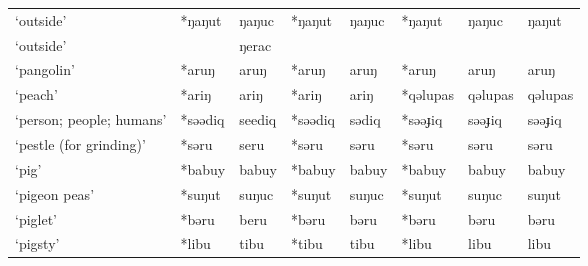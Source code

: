 \begin{landscape}
\begin{longtable}[c]{@{}p{3cm}<{\raggedright}p{2.75cm}<{\raggedright}p{2.75cm}<{\raggedright}p{2.75cm}<{\raggedright}p{2.75cm}<{\raggedright}p{2.75cm}<{\raggedright}p{2.75cm}<{\raggedright}p{2.75cm}<{\raggedright}@{}}
`outside'                                            & *ŋaŋut             & ŋaŋuc                          & *ŋaŋut             & ŋaŋuc                      & *ŋaŋut           & ŋaŋuc                    & ŋaŋut                             \\
`outside'                                            &              & ŋerac                          &                    &                            &                  &                          &                                   \\
`pangolin'                                           & *aruŋ              & aruŋ                           & *aruŋ              & aruŋ                       & *aruŋ            & aruŋ                     & aruŋ                              \\
`peach'                                              & *ariŋ              & ariŋ                           & *ariŋ              & ariŋ                       & *qəlupas         & qəlupas                  & qəlupas                           \\
`person; people; humans'                             & *səədiq            & seediq                         & *səədiq            & sədiq                      & *səəɟiq          & səəɟiq                   & səəɟiq                            \\
`pestle (for grinding)'                              & *səru              & seru                           & *səru              & səru                       & *səru            & səru                     & səru                              \\
`pig'                                                & *babuy             & babuy                          & *babuy             & babuy                      & *babuy           & babuy                    & babuy                             \\
`pigeon peas'                                        & *suŋut             & suŋuc                          & *suŋut             & suŋuc                      & *suŋut           & suŋuc                    & suŋut                             \\
`piglet'                                             & *bəru              & beru                           & *bəru              & bəru                       & *bəru            & bəru                     & bəru                              \\
`pigsty'                                             & *libu           & tibu                           & *tibu              & tibu                       & *libu            & libu                     & libu                              \\

\end{longtable}
\end{landscape}
